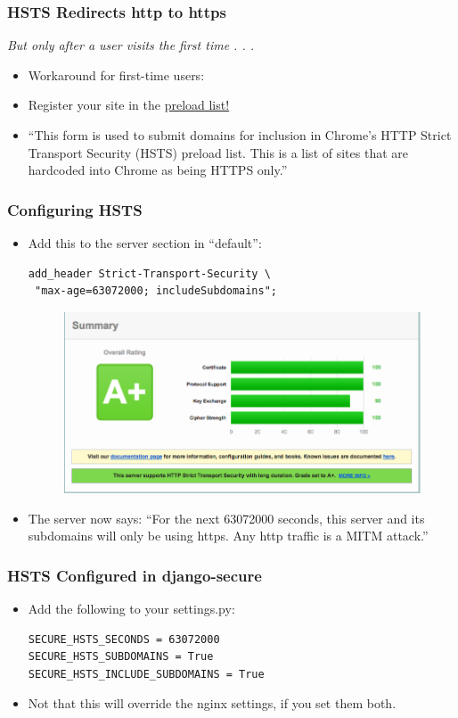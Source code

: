 \documentclass[9pt]{beamer}
\begin{document}
\begin{frame}[fragile]
\frametitle{HSTS Redirects http to https}
\emph{But only after a user visits the first time . . .}
\pause
\begin{itemize}
\item Workaround for first-time users:
\pause
\item Register your site in the \href{https://hstspreload.appspot.com/}{preload list!}
\pause
\item ``This form is used to submit domains for inclusion in Chrome's HTTP Strict Transport Security (HSTS) preload list. This is a list of sites that are hardcoded into Chrome as being HTTPS only.''
\end{itemize}
\end{frame}

\begin{frame}[fragile]
\frametitle{Configuring HSTS}
\begin{itemize}
\item Add this to the server section in ``default'':
\begin{verbatim}
add_header Strict-Transport-Security \
 "max-age=63072000; includeSubdomains";
\end{verbatim}
\begin{figure}
\includegraphics[scale=0.25]{figures/SSLLabsAp.png}
\end{figure}
\pause
\item The server now says: ``For the next 63072000 seconds, this server and its subdomains will only be using https. Any http traffic is a MITM attack.''
\end{itemize}
\end{frame}

\begin{frame}[fragile]
\frametitle{HSTS Configured in django-secure}
\begin{itemize}
\item Add the following to your settings.py:
\begin{verbatim}
SECURE_HSTS_SECONDS = 63072000
SECURE_HSTS_SUBDOMAINS = True
SECURE_HSTS_INCLUDE_SUBDOMAINS = True
\end{verbatim}
\pause
\item Not that this will override the nginx settings, if you set them both.
\end{itemize}
\end{frame}
\end{document}
